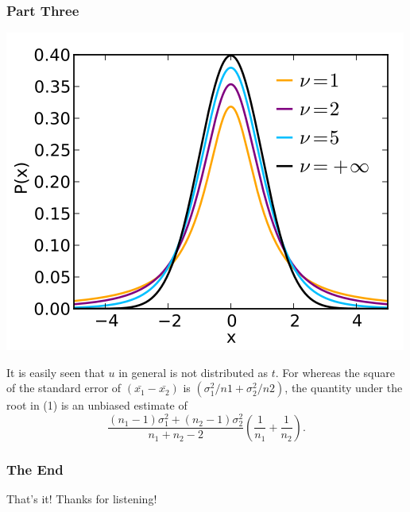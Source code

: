 \documentclass{beamer}
\begin{document}
  \begin{frame}
  \frametitle{Part Three}
    \begin{center}
      \includegraphics[scale=.25]{tDist.png} 
    \end{center}
    It is easily seen that $u$ in general is not distributed as $t$. For whereas the
    square of the standard error of $(\bar{x_1}-\bar{x_2})$ is
    $(\sigma_1^2/n1+\sigma_2^2/n2)$, the quantity under the root in (1) is an
    unbiased estimate of
    \[
    \frac{(n_1-1)\sigma_1^2+(n_2-1)\sigma_2^2}{n_1+n_2-2}
    \left(\frac{1}{n_1}+\frac{1}{n_2}\right).
    \]
  \end{frame}  

  \begin{frame}
  \frametitle{The End}
    That's it! Thanks for listening! 
  \end{frame}
\end{document}
